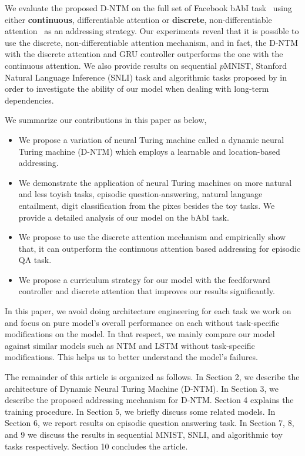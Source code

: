 \documentclass[12pt]{article}
\begin{document}
We evaluate the proposed D-NTM on the full set of Facebook bAbI
task~\citep{weston2014memory} using either {\bf continuous}, differentiable attention or
{\bf discrete}, non-differentiable attention~\citep{rlntm} as an addressing strategy. Our
experiments reveal that it is possible to use the discrete, non-differentiable
attention mechanism, and in fact, the D-NTM with the discrete attention and GRU controller
outperforms the one with the continuous attention. We also provide results on sequential $p$MNIST, Stanford Natural Language Inference (SNLI)
task and algorithmic tasks proposed by \citep{graves2014neural} in order to 
investigate the ability of our model when dealing with long-term dependencies.

We summarize our contributions in this paper as below,

\begin{itemize}
    \item We propose a variation of neural Turing machine called a dynamic
        neural Turing machine (D-NTM) which employs a learnable and location-based
        addressing.
    \item We demonstrate the application of neural Turing machines on more natural
        and less toyish tasks, episodic question-answering, natural language entailment, digit classification 
        from the pixes besides the toy tasks. We provide a detailed analysis of our model on the bAbI task.
    \item We propose to use the discrete attention mechanism and empirically show
        that, it can outperform the continuous attention based addressing for episodic QA task.
    \item We propose a curriculum strategy for our model with the feedforward controller
    and discrete attention that improves our results significantly.
\end{itemize}

In this paper, we avoid doing architecture engineering for each task we work on and focus on pure model's overall performance on each without task-specific modifications on the model. In that respect, we mainly compare our model against similar models such as NTM and LSTM  without task-specific modifications. This helps us to better understand the model's failures.

The remainder of this article is organized as follows. In Section 2, we describe the architecture of Dynamic Neural Turing Machine (D-NTM). In Section 3, we describe the proposed addressing mechanism for D-NTM. Section 4 explains the training procedure. In Section 5, we briefly  discuss some related models. In Section 6, we report results on episodic question answering task. In Section 7, 8, and 9 we discuss the results in sequential MNIST, SNLI, and algorithmic toy tasks respectively. Section 10 concludes the article. 
\end{document}
